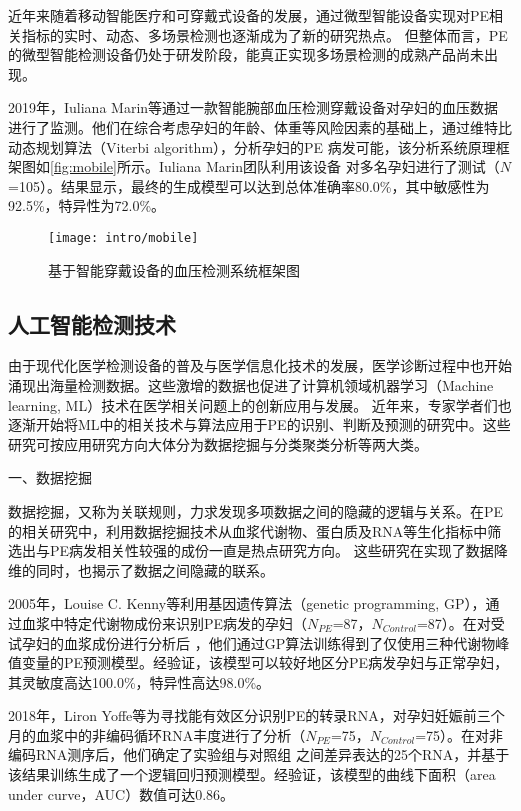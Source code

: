 近年来随着移动智能医疗和可穿戴式设备的发展，通过微型智能设备实现对PE相关指标的实时、动态、多场景检测也逐渐成为了新的研究热点。
但整体而言，PE的微型智能检测设备仍处于研发阶段，能真正实现多场景检测的成熟产品尚未出现。

2019年，Iuliana Marin等\cite{Marin2019,Marin2020}通过一款智能腕部血压检测穿戴设备对孕妇的血压数据进行了监测。他们在综合考虑孕妇的年龄、体重等风险因素的基础上，通过维特比动态规划算法（Viterbi algorithm），分析孕妇的PE
病发可能，该分析系统原理框架图如\autoref{fig:mobile}所示。Iuliana Marin团队利用该设备
对多名孕妇进行了测试（$N$=105）。结果显示，最终的生成模型可以达到总体准确率80.0\%，其中敏感性为92.5\%，特异性为72.0\%\cite{Marin2019}。
\begin{figure}[htbp]
    \centering
    \texttt{[image: intro/mobile]}
    \caption[基于智能穿戴设备的血压检测系统框架图]{\label{fig:mobile}基于智能穿戴设备的血压检测系统框架图\cite{Marin2019,Marin2020}}
\end{figure}

\subsection{人工智能检测技术}
由于现代化医学检测设备的普及与医学信息化技术的发展，医学诊断过程中也开始涌现出海量检测数据。这些激增的数据也促进了计算机领域机器学习（Machine learning, ML）技术在医学相关问题上的创新应用与发展。
近年来，专家学者们也逐渐开始将ML中的相关技术与算法应用于PE的识别、判断及预测的研究中。这些研究可按应用研究方向大体分为数据挖掘与分类聚类分析等两大类\cite{Mehta2016}。

一、数据挖掘

数据挖掘，又称为关联规则，力求发现多项数据之间的隐藏的逻辑与关系\cite{Han2006}。在PE的相关研究中，利用数据挖掘技术从血浆代谢物、蛋白质及RNA等生化指标中筛选出与PE病发相关性较强的成份一直是热点研究方向。
这些研究在实现了数据降维的同时，也揭示了数据之间隐藏的联系。

2005年，Louise C. Kenny等\cite{Kenny2005}利用基因遗传算法（genetic programming, GP），通过血浆中特定代谢物成份来识别PE病发的孕妇（$N_{PE}$=87，$N_{Control}$=87）。在对受试孕妇的血浆成份进行分析后
，他们通过GP算法训练得到了仅使用三种代谢物峰值变量的PE预测模型。经验证，该模型可以较好地区分PE病发孕妇与正常孕妇，其灵敏度高达100.0\%，特异性高达98.0\%。

2018年，Liron Yoffe等\cite{Yoffe2018}为寻找能有效区分识别PE的转录RNA，对孕妇妊娠前三个月的血浆中的非编码循环RNA丰度进行了分析（$N_{PE}$=75，$N_{Control}$=75）。在对非编码RNA测序后，他们确定了实验组与对照组
之间差异表达的25个RNA，并基于该结果训练生成了一个逻辑回归预测模型。经验证，该模型的曲线下面积（area under curve，AUC）数值可达0.86。

